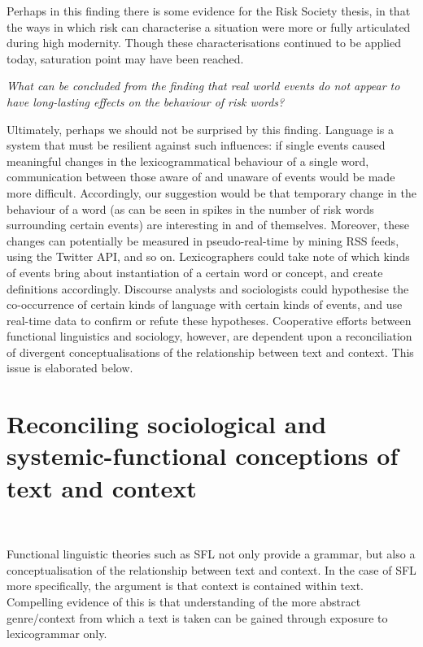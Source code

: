	Perhaps in this finding there is some evidence for the Risk Society thesis, in that the ways in which risk can characterise a situation were more or fully articulated during high modernity. Though these characterisations continued to be applied today, saturation point may have been reached.

    \emph{What can be concluded from the finding that real world events do not appear to have long-lasting effects on the behaviour of risk words?}

        Ultimately, perhaps we should not be surprised by this finding. Language is a system that must be resilient against such influences: if single events caused meaningful changes in the lexicogrammatical behaviour of a single word, communication between those aware of and unaware of events would be made more difficult. Accordingly, our suggestion would be that temporary change in the behaviour of a word (as can be seen in spikes in the number of risk words surrounding certain events) are interesting in and of themselves. Moreover, these changes can potentially be measured in pseudo-real-time by mining RSS feeds, using the Twitter API, and so on. Lexicographers could take note of which kinds of events bring about instantiation of a certain word or concept, and create definitions accordingly. Discourse analysts and sociologists could hypothesise the co-occurrence of certain kinds of language with certain kinds of events, and use real-time data to confirm or refute these hypotheses. Cooperative efforts between functional linguistics and sociology, however, are dependent upon a reconciliation of divergent conceptualisations of the relationship between text and context. This issue is elaborated below.

        
\section{Reconciling sociological and systemic-functional conceptions of text and context}

	
    ~\ 
    

    Functional linguistic theories such as SFL not only provide a grammar, but also a conceptualisation of the relationship between text and context. In the case of SFL more specifically, the argument is that context is contained within text. Compelling evidence of this is that understanding of the more abstract genre\slash context from which a text is taken can be gained through exposure to lexicogrammar only.

